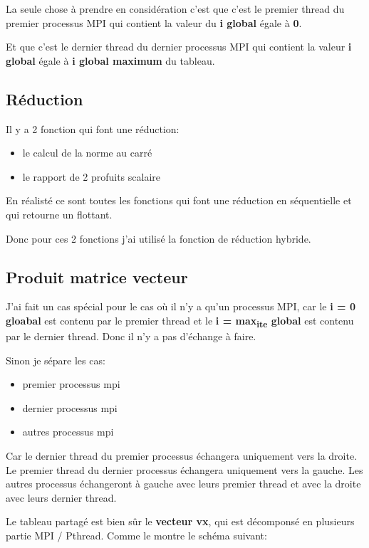 \documentclass[11pt]{article}
\begin{document}
La seule chose à prendre en considération c'est que c'est le premier thread
du premier processus MPI qui contient la valeur du \textbf{i global} égale à \textbf{0}.

Et que c'est le dernier thread du dernier processus MPI qui contient la
valeur \textbf{i global} égale à \textbf{i global maximum} du tableau.

\subsection{Réduction}
\label{sec:org69736e1}

Il y a 2 fonction qui font une réduction:
\begin{itemize}
\item le calcul de la norme au carré
\item le rapport de 2 profuits scalaire
\end{itemize}


En réalisté ce sont toutes les fonctions qui font une réduction en
séquentielle et qui retourne un flottant.

Donc pour ces 2 fonctions j'ai utilisé la fonction de réduction hybride.

\subsection{Produit matrice vecteur}
\label{sec:org6c244d4}

J'ai fait un cas spécial pour le cas où il n'y a qu'un processus MPI, car le
\textbf{i = 0 gloabal} est contenu par le premier thread et le \textbf{i = max\textsubscript{ite} global}
est contenu par le dernier thread. Donc il n'y a pas d'échange à faire.

Sinon je sépare les cas:
\begin{itemize}
\item premier processus mpi
\item dernier processus mpi
\item autres processus mpi
\end{itemize}


Car le dernier thread du premier processus échangera uniquement vers la
droite.
Le premier thread du dernier processus échangera uniquement vers la gauche.
Les autres processus échangeront à gauche avec leurs premier thread et avec
la droite avec leurs dernier thread.

Le tableau partagé est bien sûr le \textbf{vecteur vx}, qui est décomponsé en
plusieurs partie MPI / Pthread. Comme le montre le schéma suivant:
\end{document}
